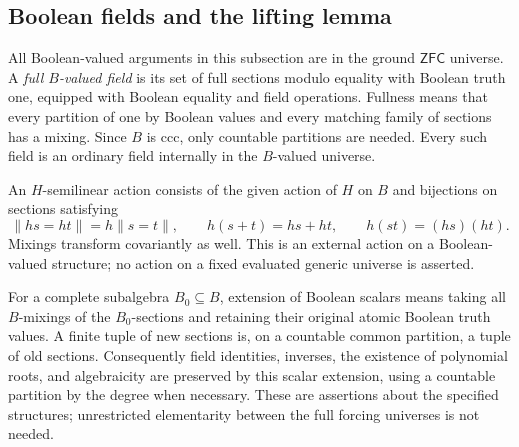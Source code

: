 \documentclass[11pt,a4paper]{article}
\theoremstyle{definition}\newtheorem{definition}[theorem]{Definition}
\theoremstyle{remark}\newtheorem{remark}[theorem]{Remark}
\begin{document}
\subsection{Boolean fields and the lifting lemma}
All Boolean-valued arguments in this subsection are in the ground $\mathsf{ZFC}$ universe. A \emph{full $B$-valued field} is its set of full sections modulo equality with Boolean truth one, equipped with Boolean equality and field operations. Fullness means that every partition of one by Boolean values and every matching family of sections has a mixing. Since $B$ is ccc, only countable partitions are needed. Every such field is an ordinary field internally in the $B$-valued universe.

An $H$-semilinear action consists of the given action of $H$ on $B$ and bijections on sections satisfying
\[
\lVert hs=ht\rVert=h\lVert s=t\rVert,
\qquad h(s+t)=hs+ht,\qquad h(st)=(hs)(ht).
\]
Mixings transform covariantly as well. This is an external action on a Boolean-valued structure; no action on a fixed evaluated generic universe is asserted.

For a complete subalgebra $B_0\subseteq B$, extension of Boolean scalars means taking all $B$-mixings of the $B_0$-sections and retaining their original atomic Boolean truth values. A finite tuple of new sections is, on a countable common partition, a tuple of old sections. Consequently field identities, inverses, the existence of polynomial roots, and algebraicity are preserved by this scalar extension, using a countable partition by the degree when necessary. These are assertions about the specified structures; unrestricted elementarity between the full forcing universes is not needed.
\end{document}
